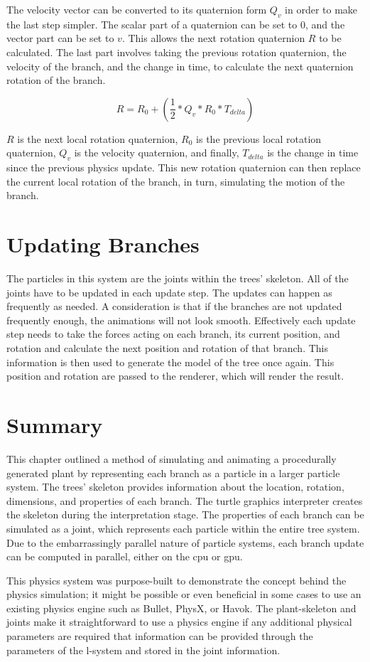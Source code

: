 \noindent
The velocity vector can be converted to its quaternion form $Q_v$ in order to make the last step simpler. The scalar part of a quaternion can be set to 0, and the vector part can be set to $v$. This allows the next rotation quaternion $R$ to be calculated. The last part involves taking the previous rotation quaternion, the velocity of the branch, and the change in time, to calculate the next quaternion rotation of the branch.

\begin{equation}
R = R_0 + (\frac{1}{2} * Q_v * R_0 * T_{delta})
\end{equation}

\noindent
$R$ is the next local rotation quaternion, $R_0$ is the previous local rotation quaternion, $Q_v$ is the velocity quaternion, and finally, $T_{delta}$ is the change in time since the previous physics update. This new rotation quaternion can then replace the current local rotation of the branch, in turn, simulating the motion of the branch.

\section{Updating Branches}

The particles in this system are the joints within the trees' skeleton. All of the joints have to be updated in each update step. The updates can happen as frequently as needed. A consideration is that if the branches are not updated frequently enough, the animations will not look smooth. Effectively each update step needs to take the forces acting on each branch, its current position, and rotation and calculate the next position and rotation of that branch. This information is then used to generate the model of the tree once again. This position and rotation are passed to the renderer, which will render the result.

\newpage
\section{Summary}

This chapter outlined a method of simulating and animating a procedurally generated plant by representing each branch as a  particle in a larger particle system. The trees' skeleton provides information about the location, rotation, dimensions, and properties of each branch. The turtle graphics interpreter creates the skeleton during the interpretation stage. The properties of each branch can be simulated as a joint, which represents each particle within the entire tree system. Due to the embarrassingly parallel nature of particle systems, each branch update can be computed in parallel, either on the \acrshort{cpu} or \acrshort{gpu}. 

This physics system was purpose-built to demonstrate the concept behind the physics simulation; it might be possible or even beneficial in some cases to use an existing physics engine such as Bullet, PhysX, or Havok. The plant-skeleton and joints make it straightforward to use a physics engine if any additional physical parameters are required that information can be provided through the parameters of the l-system and stored in the joint information. 


